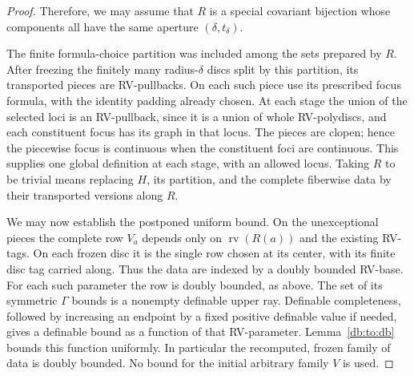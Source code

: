 \documentclass[12pt]{amsart}
\theoremstyle{plain}
\theoremstyle{definition}
\theoremstyle{remark}
\newtheorem{ter}[thm]{Terminology}
\numberwithin{equation}{section}
\theoremstyle{plain}
\newcommand{\0}{\emptyset}
\DeclareMathOperator{\rv}{rv}
\begin{document}
\begin{proof}

Therefore, we may assume that $R$ is a special covariant bijection whose components all have the same  aperture $(\delta, t_{\delta})$.


The finite formula-choice partition was included among the sets prepared by $R$. After freezing the finitely many radius-$\delta$ discs split by this partition, its transported pieces are RV-pullbacks. On each such piece use its prescribed focus formula, with the identity padding already chosen. At each stage the union of the selected loci is an RV-pullback, since it is a union of whole RV-polydiscs, and each constituent focus has its graph in that locus. The pieces are clopen; hence the piecewise focus is continuous when the constituent foci are continuous. This supplies one global definition at each stage, with an allowed locus. Taking $R$ to be trivial means replacing $H$, its partition, and the complete fiberwise data by their transported versions along $R$.

We may now establish the postponed uniform bound. On the unexceptional pieces the complete row $V_a$ depends only on $\rv(R(a))$ and the existing RV-tags. On each frozen disc it is the single row chosen at its center, with its finite disc tag carried along. Thus the data are indexed by a doubly bounded RV-base. For each such parameter the row is doubly bounded, as above. The set of its symmetric $\Gamma$ bounds is a nonempty definable upper ray. Definable completeness, followed by increasing an endpoint by a fixed positive definable value if needed, gives a definable bound as a function of that RV-parameter. Lemma~\ref{db:to:db} bounds this function uniformly. In particular the recomputed, frozen family of data is doubly bounded. No bound for the initial arbitrary family $V$ is used.



\end{proof}
\end{document}
